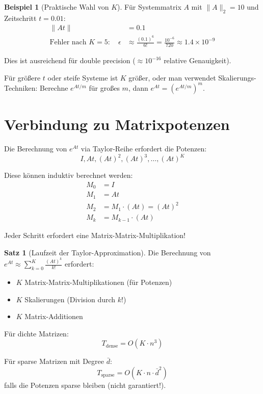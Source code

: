 ﻿\documentclass[a4paper,12pt]{report}
\theoremstyle{definition}
\newtheorem{beispiel}{Beispiel}
\newtheorem{satz}{Satz}
\begin{document}
	\begin{beispiel}[Praktische Wahl von $K$]
		Für Systemmatrix $A$ mit $\|A\|_2 = 10$ und Zeitschritt $t = 0.01$:
		\begin{align}
			\|At\| &= 0.1 \\
			\text{Fehler nach } K=5: \quad \epsilon &\approx \frac{(0.1)^6}{6!} = \frac{10^{-6}}{720} \approx 1.4 \times 10^{-9}
		\end{align}
		
		Dies ist ausreichend für double precision ($\approx 10^{-16}$ relative Genauigkeit).
		
		Für größere $t$ oder steife Systeme ist $K$ größer, oder man verwendet Skalierungs-Techniken: Berechne $e^{At/m}$ für großes $m$, dann $e^{At} = (e^{At/m})^m$.
	\end{beispiel}
	
	\section{Verbindung zu Matrixpotenzen}
	
	Die Berechnung von $e^{At}$ via Taylor-Reihe erfordert die Potenzen:
	\[
	I, At, (At)^2, (At)^3, \ldots, (At)^K
	\]
	
	Diese können induktiv berechnet werden:
	\begin{align}
		M_0 &= I \\
		M_1 &= At \\
		M_2 &= M_1 \cdot (At) = (At)^2 \\
		M_k &= M_{k-1} \cdot (At)
	\end{align}
	
	Jeder Schritt erfordert eine Matrix-Matrix-Multiplikation!
	
	\begin{satz}[Laufzeit der Taylor-Approximation]
		Die Berechnung von $e^{At} \approx \sum_{k=0}^K \frac{(At)^k}{k!}$ erfordert:
		\begin{itemize}
			\item $K$ Matrix-Matrix-Multiplikationen (für Potenzen)
			\item $K$ Skalierungen (Division durch $k!$)
			\item $K$ Matrix-Additionen
		\end{itemize}
		
		Für dichte Matrizen:
		\[
		T_{\text{dense}} = O(K \cdot n^3)
		\]
		
		Für sparse Matrizen mit Degree $\bar{d}$:
		\[
		T_{\text{sparse}} = O(K \cdot n \cdot \bar{d}^2)
		\]
		falls die Potenzen sparse bleiben (nicht garantiert!).
	\end{satz}
	
\end{document}
